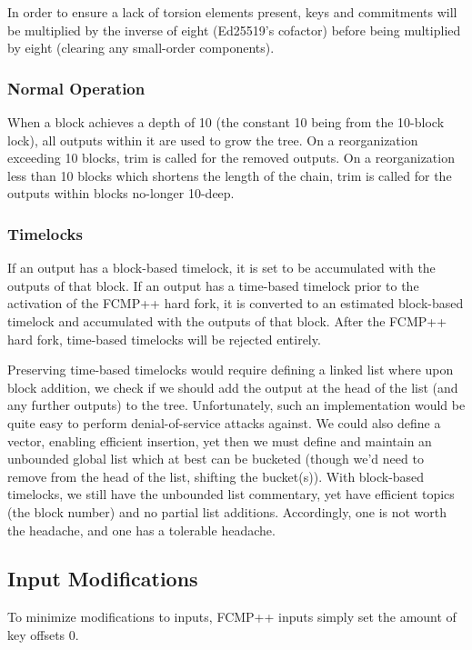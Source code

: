 \documentclass[]{article}
\begin{document}
In order to ensure a lack of torsion elements present, keys and commitments will be multiplied by the inverse of eight (Ed25519's cofactor) before being multiplied by eight (clearing any small-order components).

\subsubsection{Normal Operation}

When a block achieves a depth of 10 (the constant 10 being from the 10-block lock), all outputs within it are used to grow the tree. On a reorganization exceeding 10 blocks, trim is called for the removed outputs. On a reorganization less than 10 blocks which shortens the length of the chain, trim is called for the outputs within blocks no-longer 10-deep.

\subsubsection{Timelocks}

If an output has a block-based timelock, it is set to be accumulated with the outputs of that block. If an output has a time-based timelock prior to the activation of the FCMP++ hard fork, it is converted to an estimated block-based timelock and accumulated with the outputs of that block. After the FCMP++ hard fork, time-based timelocks will be rejected entirely.

Preserving time-based timelocks would require defining a linked list where upon block addition, we check if we should add the output at the head of the list (and any further outputs) to the tree. Unfortunately, such an implementation would be quite easy to perform denial-of-service attacks against. We could also define a vector, enabling efficient insertion, yet then we must define and maintain an unbounded global list which at best can be bucketed (though we'd need to remove from the head of the list, shifting the bucket(s)). With block-based timelocks, we still have the unbounded list commentary, yet have efficient topics (the block number) and no partial list additions. Accordingly, one is not worth the headache, and one has a tolerable headache.

\subsection{Input Modifications}

To minimize modifications to inputs, FCMP++ inputs simply set the amount of key offsets 0.
\end{document}
